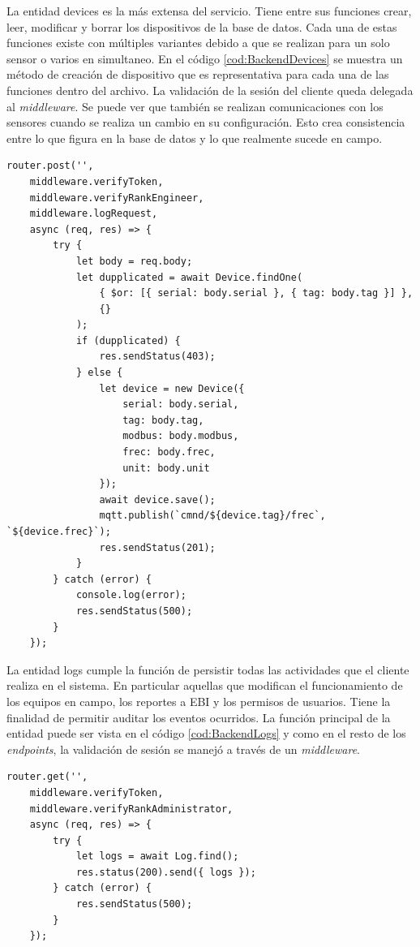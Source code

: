 La entidad devices es la más extensa del servicio.
Tiene entre sus funciones crear, leer, modificar y borrar los dispositivos de la base de datos.
Cada una de estas funciones existe con múltiples variantes debido a que se realizan para un solo sensor o varios en simultaneo.
En el código \ref{cod:BackendDevices} se muestra un método de creación de dispositivo que es representativa para cada una de las funciones dentro del archivo.
La validación de la sesión del cliente queda delegada al \emph{middleware}.
Se puede ver que también se realizan comunicaciones con los sensores cuando se realiza un cambio en su configuración.
Esto crea consistencia entre lo que figura en la base de datos y lo que realmente sucede en campo.


\begin{lstlisting}[label=cod:BackendDevices,caption=Creación de dispositivo de la entidad devices]
router.post('',
    middleware.verifyToken,
    middleware.verifyRankEngineer,
    middleware.logRequest,
    async (req, res) => {
        try {
            let body = req.body;
            let dupplicated = await Device.findOne(
                { $or: [{ serial: body.serial }, { tag: body.tag }] },
                {}
            );
            if (dupplicated) {
                res.sendStatus(403);
            } else {
                let device = new Device({
                    serial: body.serial,
                    tag: body.tag,
                    modbus: body.modbus,
                    frec: body.frec,
                    unit: body.unit
                });
                await device.save();
                mqtt.publish(`cmnd/${device.tag}/frec`, `${device.frec}`);
                res.sendStatus(201);
            }
        } catch (error) {
            console.log(error);
            res.sendStatus(500);
        }
    });
\end{lstlisting}

La entidad logs cumple la función de persistir todas las actividades que el cliente realiza en el sistema.
En particular aquellas que modifican el funcionamiento de los equipos en campo, los reportes a EBI y los permisos de usuarios.
Tiene la finalidad de permitir auditar los eventos ocurridos.
La función principal de la entidad puede ser vista en el código \ref{cod:BackendLogs} y como en el resto de los \emph{endpoints}, la validación de sesión se manejó a través de un \emph{middleware}.

\newpage

\begin{lstlisting}[label=cod:BackendLogs,caption=Función principal de la entidad logs]
router.get('',
    middleware.verifyToken,
    middleware.verifyRankAdministrator,
    async (req, res) => {
        try {
            let logs = await Log.find();
            res.status(200).send({ logs });
        } catch (error) {
            res.sendStatus(500);
        }
    });
\end{lstlisting}

